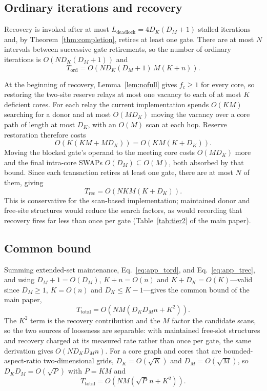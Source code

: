 \subsection{Ordinary iterations and recovery}
\label{app:complexity_ord}

Recovery is invoked after at most $L_{\mathrm{deadlock}}=4D_K(D_M+1)$ stalled
iterations and, by Theorem~\ref{thm:completion}, retires at least one gate.
There are at most $N$ intervals between successive gate retirements, so the
number of ordinary iterations is $O(ND_K(D_M+1))$ and
\begin{equation}
T_{\mathrm{ord}}=O\!\left(ND_K(D_M+1)\,M(K+n)\right).
\label{eq:app_tord}
\end{equation}

At the beginning of recovery, Lemma~\ref{lem:nofull} gives $f_c\ge1$ for every
core, so restoring the two-site reserve relays at most one vacancy to each of
at most $K$ deficient cores.  For each relay the current implementation spends
$O(KM)$ searching for a donor and at most $O(MD_K)$ moving the vacancy over a
core path of length at most $D_K$, with an $O(M)$ scan at each hop.  Reserve
restoration therefore costs
\[
  O\!\left(K(KM+MD_K)\right) = O\!\left(KM(K+D_K)\right).
\]
Moving the blocked gate's operand to the meeting core costs $O(MD_K)$ more and
the final intra-core SWAPs $O(D_M)\subseteq O(M)$, both absorbed by that
bound.  Since each transaction retires at least one gate, there are at most
$N$ of them, giving
\begin{equation}
T_{\mathrm{rec}} = O\!\left(NKM(K+D_K)\right).
\label{eq:app_trec}
\end{equation}
This is conservative for the scan-based implementation; maintained donor and
free-site structures would reduce the search factors, as would recording that
recovery fires far less than once per gate
(Table~\ref{tab:tier2} of the main paper).

\subsection{Common bound}
\label{app:complexity_total}

Summing extended-set maintenance, Eq.~\eqref{eq:app_tord}, and
Eq.~\eqref{eq:app_trec}, and using $D_M+1=O(D_M)$, $K+n=O(n)$ and
$K+D_K=O(K)$---valid since $D_M\ge1$, $K=O(n)$ and $D_K\le K-1$---gives the
common bound of the main paper,
\[
  T_{\mathrm{total}} = O\!\left(NM\left(D_KD_Mn+K^2\right)\right).
\]
The $K^2$ term is the recovery contribution and the $M$ factor the candidate
scans, so the two sources of looseness are separable: with maintained
free-slot structures and recovery charged at its measured rate rather than
once per gate, the same derivation gives $O(ND_KD_Mn)$.  For a core graph and
cores that are bounded-aspect-ratio two-dimensional grids,
$D_K=O(\sqrt{K})$ and $D_M=O(\sqrt{M})$, so $D_KD_M=O(\sqrt{P})$ with
$P=KM$ and
\[
  T_{\mathrm{total}} = O\!\left(NM\left(\sqrt{P}\,n+K^2\right)\right).
\]

